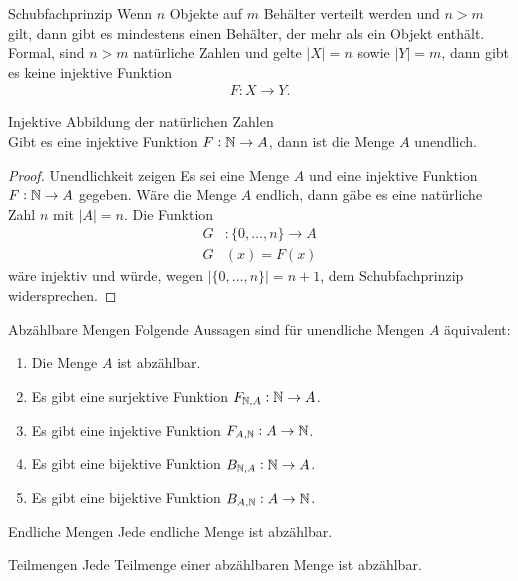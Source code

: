 \begin{lemma}{Schubfachprinzip}
    Wenn $n$ Objekte auf $m$ Behälter verteilt werden und $n>m$ gilt, dann gibt es mindestens einen Behälter, der mehr als ein Objekt enthält. Formal, sind $n>m$ natürliche Zahlen und gelte $|X|= n$ sowie $|Y|=m$, dann gibt es keine injektive Funktion
    \begin{align*}
        F: X\to Y.
    \end{align*}
\end{lemma}

\begin{lemma}{Injektive Abbildung der natürlichen Zahlen}\\
    Gibt es eine injektive Funktion $F:\mathbb{N}\to A$, dann ist die Menge $A$ unendlich.
\end{lemma}

\begin{proof}{Unendlichkeit zeigen}
    Es sei eine Menge $A$ und eine injektive Funktion $F:\mathbb{N}\to A$ gegeben. Wäre die Menge $A$ endlich, dann gäbe es eine natürliche Zahl $n$ mit $|A|=n$. Die Funktion
    \begin{align*}
        G&:\{0,\dots,n\}\to A\\
        G&(x) = F(x)
    \end{align*}
    wäre injektiv und würde, wegen $|\{0,\dots,n\}|=n+1$, dem Schubfachprinzip widersprechen.
\end{proof}

\begin{lemma}{Abzählbare Mengen}
    Folgende Aussagen sind für unendliche Mengen $A$ äquivalent:
    \begin{enumerate}
        \item Die Menge $A$ ist abzählbar.
        \item Es gibt eine surjektive Funktion $F_{\mathbb{N},A}:\mathbb{N}\to A$.
        \item Es gibt eine injektive Funktion $F_{A,\mathbb{N}}:A\to\mathbb{N}$.
        \item Es gibt eine bijektive Funktion $B_{\mathbb{N},A}:\mathbb{N}\to A$.
        \item Es gibt eine bijektive Funktion $B_{A,\mathbb{N}}:A\to\mathbb{N}$.
    \end{enumerate}
\end{lemma}

\begin{lemma}{Endliche Mengen}
    Jede endliche Menge ist abzählbar.
\end{lemma}

\begin{lemma}{Teilmengen}
    Jede Teilmenge einer abzählbaren Menge ist abzählbar.
\end{lemma}

